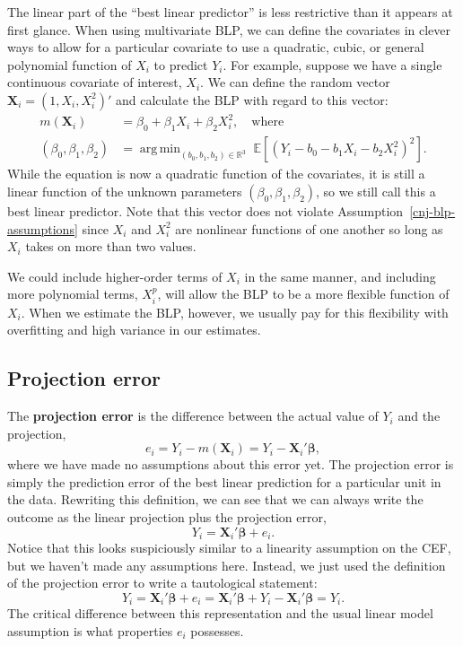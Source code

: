 \documentclass[
  13pt,
  letterpaper,
  DIV=11,
  numbers=noendperiod]{scrreprt}
\newcommand{\mb}{\bm}
\newcommand{\E}{\mathbb{E}}
\newcommand{\X}{\mb{X}}
\newcommand{\bfbeta}{\mb{\beta}}
\DeclareMathOperator*{\argmin}{arg\,min}
\theoremstyle{plain}
\theoremstyle{plain}
\theoremstyle{definition}
\theoremstyle{definition}
\theoremstyle{remark}
\begin{document}
The linear part of the ``best linear predictor'' is less restrictive
than it appears at first glance. When using multivariate BLP, we can
define the covariates in clever ways to allow for a particular covariate
to use a quadratic, cubic, or general polynomial function of \(X_i\) to
predict \(Y_i\). For example, suppose we have a single continuous
covariate of interest, \(X_i\). We can define the random vector
\(\X_i = (1, X_i, X_i^2)'\) and calculate the BLP with regard to this
vector: \[ 
\begin{aligned}
m(\X_i) &= \beta_0 + \beta_1X_i + \beta_2X_i^2, \quad\text{where} \\ 
(\beta_0,\beta_1,\beta_2)&=\argmin_{(b_0,b_1,b_2) \in \mathbb{R}^3}\;\E[(Y_{i} - b_{0} - b_{1}X_{i} - b_{2}X_{i}^{2})^{2}].
\end{aligned}
\] While the equation is now a quadratic function of the covariates, it
is still a linear function of the unknown parameters
\((\beta_{0}, \beta_{1}, \beta_{2})\), so we still call this a best
linear predictor. Note that this vector does not violate
Assumption~\ref{cnj-blp-assumptions} since \(X_i\) and \(X_i^2\) are
nonlinear functions of one another so long as \(X_i\) takes on more than
two values.

We could include higher-order terms of \(X_i\) in the same manner, and
including more polynomial terms, \(X_i^p\), will allow the BLP to be a
more flexible function of \(X_i\). When we estimate the BLP, however, we
usually pay for this flexibility with overfitting and high variance in
our estimates.

\subsection{Projection error}\label{projection-error}

The \textbf{projection error} is the difference between the actual value
of \(Y_i\) and the projection, \[ 
e_{i} = Y_{i} - m(\X_{i}) = Y_i - \X_{i}'\bfbeta,
\] where we have made no assumptions about this error yet. The
projection error is simply the prediction error of the best linear
prediction for a particular unit in the data. Rewriting this definition,
we can see that we can always write the outcome as the linear projection
plus the projection error, \[ 
Y_{i} = \X_{i}'\bfbeta + e_{i}.
\] Notice that this looks suspiciously similar to a linearity assumption
on the CEF, but we haven't made any assumptions here. Instead, we just
used the definition of the projection error to write a tautological
statement: \[ 
Y_{i} = \X_{i}'\bfbeta + e_{i} = \X_{i}'\bfbeta + Y_{i} - \X_{i}'\bfbeta = Y_{i}.
\] The critical difference between this representation and the usual
linear model assumption is what properties \(e_{i}\) possesses.
\end{document}
